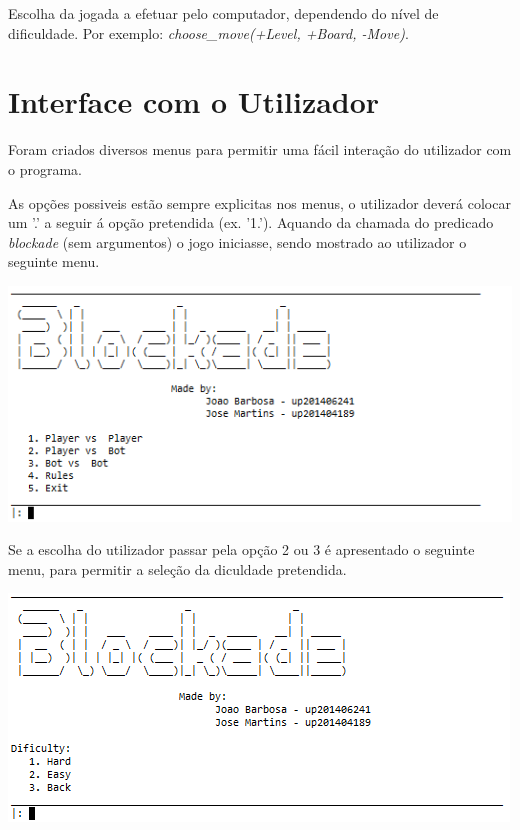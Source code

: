 \documentclass[a4paper]{article}
\begin{document}
Escolha da jogada a efetuar pelo computador, dependendo do nível de dificuldade. Por exemplo: \textit{choose\_move(+Level, +Board, -Move)}.


\newpage
\section{Interface com o Utilizador}


Foram criados diversos menus para permitir uma fácil interação do utilizador com o programa.
\par As opções possiveis estão sempre explicitas nos menus, o utilizador deverá colocar um '.' a seguir á opção pretendida  (ex. '1.').
Aquando da chamada do predicado \textit{blockade} (sem argumentos) o jogo iniciasse, sendo mostrado ao utilizador o seguinte menu.

\begin{center}
	\includegraphics[scale = 0.7]{fig5.png}
\end{center}

Se a escolha do utilizador passar pela opção 2 ou 3 é apresentado o seguinte menu, para permitir a seleção da diculdade pretendida.

\begin{center}
	\includegraphics[scale = 0.7]{fig6.png}
\end{center}
\end{document}

